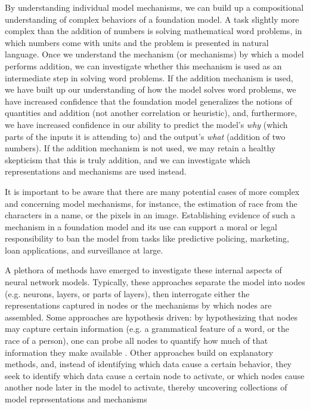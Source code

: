 By understanding individual model mechanisms, we can build up a compositional understanding of complex behaviors of a foundation model. A task slightly more complex than the addition of numbers is solving mathematical word problems, in which numbers come with units and the problem is presented in natural language. Once we understand the mechanism (or mechanisms) by which a model performs addition, we can investigate whether this mechanism is used as an intermediate step in solving word problems. If the addition mechanism is used, we have built up our understanding of how the model solves word problems, we have increased confidence that the foundation model generalizes the notions of quantities and addition (not another correlation or heuristic), and, furthermore, we have increased confidence in our ability to predict the model's \textit{why} (which parts of the inputs it is attending to) and the output's \textit{what} (addition of two numbers). If the addition mechanism is not used, we may retain a healthy skepticism that this is truly addition, and we can investigate which representations and mechanisms are used instead.

It is important to be aware that there are many potential cases of more complex and concerning model mechanisms, for instance, the estimation of race from the characters in a name, or the pixels in an image. Establishing evidence of such a mechanism in a foundation model and its use can support a moral or legal responsibility to ban the model from tasks like predictive policing, marketing, loan applications, and surveillance at large.

A plethora of methods have emerged to investigate these internal aspects of neural network models. Typically, these approaches separate the model into nodes (e.g. neurons, layers, or parts of layers), then interrogate either the representations captured in nodes or the mechanisms by which nodes are assembled. Some approaches are hypothesis driven: by hypothesizing that nodes may capture certain information (e.g. a grammatical feature of a word, or the race of a person), one can probe all nodes to quantify how much of that information they make available \citep{alain2016understanding,veldhoen2016diagnostic,belinkov2017what,adi2017finegrained,conneau2018what,hewitt2019control,hewitt2019structural,voita2020informationtheoretic,pimentel2020information}. Other approaches build on explanatory methods, and, instead of identifying which data cause a certain behavior, they seek to identify which data cause a certain node to activate, or which nodes cause another node later in the model to activate, thereby uncovering collections of model representations and mechanisms

